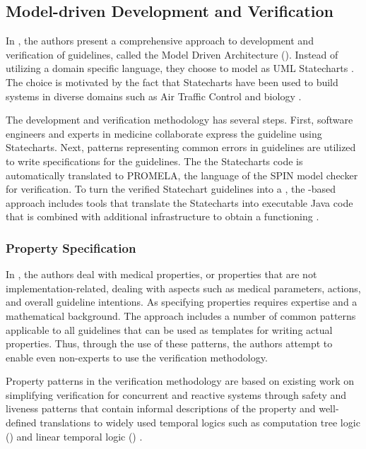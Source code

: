 \subsection{Model-driven Development and Verification}\label{sec:mda-verification}

In \cite{PerezJBI10}, the authors present a comprehensive approach
to development and verification of guidelines, called the Model Driven
Architecture (\MDA{}). Instead of
utilizing a domain specific language, they choose to model \BPGs{}
as UML Statecharts \cite{OMGSpecUrl}. The choice is motivated by
the fact that Statecharts have been used to build systems in diverse
domains such as Air Traffic Control \cite{WhittleICSE02} and biology
\cite{EfroniGR03}.

The development and verification methodology has several steps.
First, software engineers and experts in medicine collaborate
express the guideline using Statecharts. Next, patterns
representing common errors in guidelines are utilized to
write specifications for the guidelines. The
the Statecharts code is automatically translated to PROMELA,
the language of the SPIN model checker \cite{MikkISFST98} for verification.
To turn the verified Statechart guidelines into a \CDSS{}, the
\MDA{}-based approach includes tools that translate the Statecharts into
executable Java code that is combined with additional infrastructure to
obtain a functioning \CDSS{}.

\subsubsection{Property Specification}

In \cite{PerezJBI10}, the authors deal with
medical properties, or properties that are not implementation-related,
dealing with aspects such as  medical parameters, \HCP{} actions,
and overall guideline intentions. As specifying properties
requires expertise and a mathematical background. The \MDA{}
approach includes a number of common patterns applicable
to all guidelines that can be
used as templates for writing actual properties. Thus,
through the use of these patterns, the authors attempt
to enable even non-experts to use the \MDA{} verification
methodology.

Property patterns in the \MDA{} verification methodology
are based on existing work on simplifying verification for
concurrent and reactive systems through safety and liveness patterns
that contain informal descriptions of the property and
well-defined translations to widely used temporal logics such
as computation tree logic (\CTL{}) and linear temporal logic (\LTL{})
\cite{DwyerFM98,DwyerICSE98,BitschSAFECOMP01,RyndinaThesis05}.

